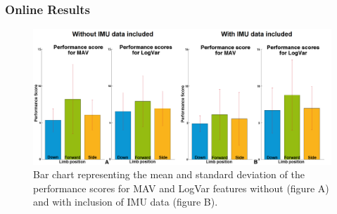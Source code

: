 	\subsubsection*{Online Results}
\begin{figure}[H]
	\centering
	\includegraphics[width=1\textwidth]{figures/paperFigures/GotItTimeCol}  %
	\caption{Bar chart representing the mean and standard deviation of the performance scores for MAV and LogVar features without (figure A) and with inclusion of IMU data (figure B).}
	\label{fig:GotItTimeCol}
\end{figure}
	
